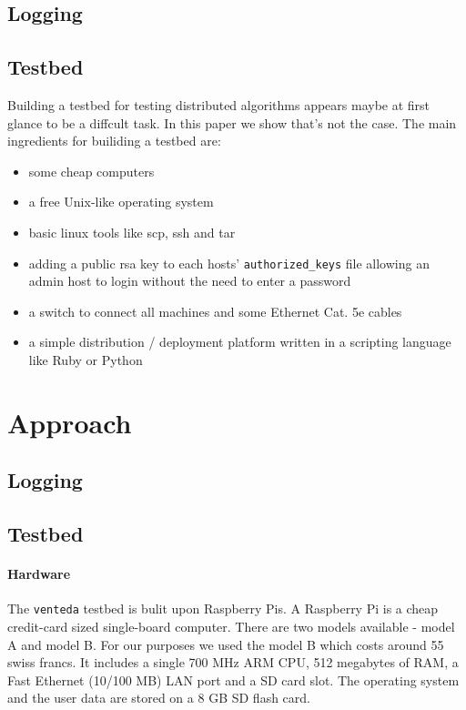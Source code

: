 \documentclass[10pt,a4paper]{article}
\begin{document}
\subsection{Logging}
\subsection{Testbed}
Building a testbed for testing distributed algorithms appears maybe at first glance to be a diffcult task. In this paper we show that's not the case. The main ingredients for builiding a testbed are:
\begin{itemize}
\itemsep0em 
\item some cheap computers
\item a free Unix-like operating system
\item basic linux tools like scp, ssh and tar
\item adding a public rsa key to each hosts' \texttt{authorized\_keys} file allowing  an admin host to login without the need to enter a password
\item a switch to connect all machines and some Ethernet Cat. 5e cables 
\item a simple distribution / deployment platform written in a scripting language like Ruby or Python
\end{itemize}

\section{Approach}
\subsection{Logging}

\subsection{Testbed}
\paragraph{Hardware}
The \texttt{venteda} testbed is bulit upon Raspberry Pis. A Raspberry Pi is a cheap credit-card sized single-board computer. There are two models available - model A and model B. For our purposes we used the model B which costs around 55 swiss francs. It includes a single 700 MHz ARM CPU, 512 megabytes of RAM, a Fast Ethernet (10/100 MB) LAN port and a SD card slot. The operating system and the user data are stored on a 8 GB SD flash card. 
\end{document}
